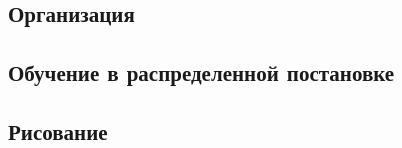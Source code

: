 

\subsection{Организация}



\subsection{Обучение в распределенной постановке}




\subsection{Рисование}


